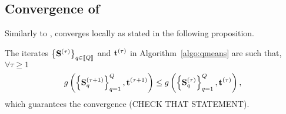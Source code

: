 \iffalse
\begin{remark}[Assignment/Re-estimation trade-off.]
A strategy to tackle this problem would be to first run the vanilla K-means algorithm,
 obtain the matrix of centroids $U$ and then encode $U$ as a product of sparse matrices
 using Hierarchical Palm4MSA. This would however prevent us from taking advantage of 
 the expected low complexity product that plays a role in the assignement step of 
 the procedure.
\end{remark}

\todo[inline]{At some point, talk about the trade-off that we are playing with
regarding the cost of the assignment and the cost of the re-estimation procedure.}
\fi

\subsection{Convergence of \qkmeans}
Similarly to \kmeans, \qkmeans converges locally as stated in the following proposition.

\begin{proposition}
\label{thm:convergence}
The iterates $\left \lbrace{\mathbf{S}}^{(\tau)} \right \rbrace_{q\in\left \llbracket Q\right \rrbracket}$ and ${\mathbf{t}}^{(\tau)}$ in Algorithm~\ref{algo:qmeans} are such that, $\forall \tau\geq 1$
\begin{equation*}
g\left(\left\{{\mathbf{S}}_q^{(\tau+1)}\right\}_{q=1}^{Q}, {\mathbf{t}}^{(\tau+1)}\right)
\leq g\left(\left\{{\mathbf{S}}_q^{(\tau)}\right\}_{q=1}^{Q}, {\mathbf{t}}^{(\tau)}\right),
\end{equation*}
which guarantees the convergence (CHECK THAT STATEMENT).

\iffalse
\begin{equation}
\begin{split}
\label{eq:qmean_problem_2}
    g(\rmS_1^{(\tau)}, \ldots,\rmS_\nfactors^{(\tau)}, \rvt^{(\tau)} ) & \\
    = \sum_{k\in\intint{\nclusters}} \sum_{n: \rvt^{(\tau)}_n = k} & \norm{\rvx_n - \rvv^{(\tau)}_k}^2 + \sum_{q\in\intint{\nfactors}} \delta_{\mathcal{E}_q}\left (\rmS_q^{(\tau)}\right ) \\
    \text{ s.t. } \rmV = \prod_{q\in\intint{\nfactors}} & {\rmS_q^{(\tau)}}
\end{split} %
\end{equation}
\fi
\end{proposition}



